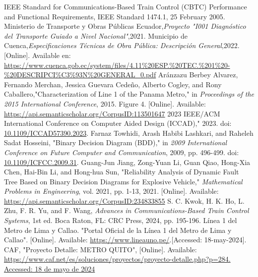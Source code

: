 \documentclass[conference]{IEEEtran}
\begin{document}

\begin{thebibliography}{00}
IEEE Standard for Communications-Based Train Control (CBTC) Performance and Functional Requirements, IEEE Standard 1474.1, 25 February 2005.
Ministerio de Transporte y Obras Públicas Ecuador,\textit{Proyecto "I001 Diagnóstico del Transporte Guiado a Nivel Nacional"},2021.
Municipio de Cuenca,\textit{Especificaciones Técnicas de Obra Pública: Descripción General},2022.[Online]. Available en: \url{https://www.cuenca.gob.ec/system/files/4.11%20ESP.%20TEC.%201%20-%20DESCRIPCI%C3%93N%20GENERAL_0.pdf}
Ar{\'a}nzazu Berbey Alvarez, Fernando Merchan, Jessica Guevara Cede{\~n}o, Alberto Cogley, and Rony Caballero,"Characterization of Line 1 of the Panama Metro," in \textit{Proceedings of the 2015 International Conference}, 2015. Figure 4. [Online]. Available: \href{https://api.semanticscholar.org/CorpusID:113501647}{https://api.semanticscholar.org/CorpusID:113501647}
2023 IEEE/ACM International Conference on Computer Aided Design (ICCAD)," 2023. doi: \href{https://doi.org/10.1109/ICCAD57390.2023}{10.1109/ICCAD57390.2023}.
Farnaz Towhidi, Arash Habibi Lashkari, and Raheleh Sadat Hosseini, "Binary Decision Diagram (BDD)," in \textit{2009 International Conference on Future Computer and Communication}, 2009, pp. 496-499. doi: \href{https://doi.org/10.1109/ICFCC.2009.31}{10.1109/ICFCC.2009.31}.
Guang-Jun Jiang, Zong-Yuan Li, Guan Qiao, Hong-Xia Chen, Hai-Bin Li, and Hong-hua Sun, "Reliability Analysis of Dynamic Fault Tree Based on Binary Decision Diagrams for Explosive Vehicle," \textit{Mathematical Problems in Engineering}, vol. 2021, pp. 1-13, 2021. [Online]. Available: \url{https://api.semanticscholar.org/CorpusID:234833855}
 S. C. Kwok, H. K. Ho, L. Zhu, F. R. Yu, and F. Wang, \textit{Advances in Communications-Based Train Control Systems}, 1st ed. Boca Raton, FL: CRC Press, 2024, pp. 195-196.
Línea 1 del Metro de Lima y Callao. "Portal Oficial de la Línea 1 del Metro de Lima y Callao". [Online].  Available: \url{https://www.lineauno.pe/}.[Accessed: 18-may-2024].
CAF, "Proyecto Detalle: METRO QUITO", [Online]. Available: \url{https://www.caf.net/es/soluciones/proyectos/proyecto-detalle.php?p=284. Accessed: 18 de mayo de 2024}

\end{thebibliography}
\end{document}
